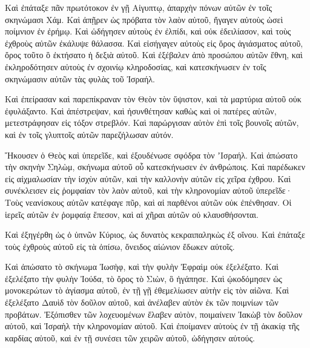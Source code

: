 {Καὶ ἐπάταξε πᾶν πρωτότοκον ἐν γῇ Αἰγυπτῳ, ἀπαρχὴν πόνων αὐτῶν ἐν τοῖς σκηνώμασι Χάμ.
Καὶ ἀπῇρεν ὡς πρόβατα τὸν λαὸν αὐτοῦ, ἤγαγεν αὐτοὺς ὡσεὶ ποίμνιον ἐν ἐρήμῳ.
Καὶ ὡδήγησεν αὐτοὺς ἐν ἐλπίδι, καὶ οὐκ ἐδειλίασον, καὶ τοὺς ἐχθροὺς αὐτῶν ἐκάλυψε θάλασσα.
Καὶ εἰσήγαγεν αὐτοὺς εἰς ὄρος ἁγιάσματος αὐτοῦ, ὄρος τοῦτο ὃ ἐκτήσατο ἡ δεξιὰ αὐτοῦ.
Καὶ ἐξέβαλεν ἀπὸ προσώπου αὐτῶν ἔθνη, καὶ ἐκληροδότησεν αὐτοὺς ἐν σχοινίῳ κληροδοσίας, καὶ κατεσκήνωσεν ἐν τοῖς σκηνώμασιν αὐτῶν τὰς φυλὰς τοῦ Ἰσραήλ.
\par }{\PP {}Καὶ ἐπείρασαν καὶ παρεπίκραναν τὸν Θεὸν τὸν ὕψιστον, καὶ τὰ μαρτύρια αὐτοῦ οὐκ ἐφυλάξαντο.
Καὶ ἀπέστρεψαν, καὶ ἠσυνθέτησαν καθὼς καὶ οἱ πατέρες αὐτῶν, μετεστράφησαν εἰς τόξον στρεβλόν.
Καὶ παρώργισαν αὐτὸν ἐπὶ τοῖς βουνοῖς αὐτῶν, καὶ ἐν τοῖς γλυπτοῖς αὐτῶν παρεζήλωσαν αὐτόν.
\par }{\PP {}Ἤκουσεν ὁ Θεὸς καὶ ὑπερεῖδε, καὶ ἐξουδένωσε σφόδρα τὸν ʼΙσραήλ.
Καὶ ἀπώσατο τὴν σκηνὴν Σηλὼμ, σκήνωμα αὐτοῦ οὗ κατεσκήνωσεν ἐν ἀνθρώποις.
Καὶ παρέδωκεν εἰς αἰχμαλωσίαν τὴν ἰσχὺν αὐτῶν, καὶ τὴν καλλονὴν αὐτῶν εἰς χεῖρα ἐχθρου.
Καὶ συνέκλεισεν εἰς ῥομφαίαν τὸν λαὸν αὐτοῦ, καὶ τὴν κληρονομίαν αὐτοῦ ὑπερεῖδε·
Τοὺς νεανίσκους αὐτῶν κατέφαγε πῦρ, καὶ αἱ παρθένοι αὐτῶν οὐκ ἐπένθησαν.
Οἱ ἱερεῖς αὐτῶν ἐν ῥομφαίᾳ ἔπεσον, καὶ αἱ χῆραι αὐτῶν οὐ κλαυσθήσονται.
\par }{\PP {}Καὶ ἐξηγέρθη ὡς ὁ ὑπνῶν Κύριος, ὡς δυνατὸς κεκραιπαληκὼς ἐξ οἴνου.
Καὶ ἐπάταξε τοὺς ἐχθροὺς αὐτοῦ εἰς τὰ ὀπίσω, ὄνειδος αἰώνιον ἔδωκεν αὐτοῖς.
\par }{\PP {}Καὶ ἀπώσατο τὸ σκήνωμα Ἰωσὴφ, καὶ τὴν φυλὴν Ἐφραὶμ οὐκ ἐξελέξατο.
Καὶ ἐξελέξατο τὴν φυλὴν Ἰούδα, τὸ ὄρος τὸ Σιὼν, ὃ ἠγάπησε.
Καὶ ᾠκοδόμησεν ὡς μονοκερώτων τὸ ἁγίασμα αὐτοῦ, ἐν τῇ γῇ ἐθεμελίωσεν αὐτὴν εἰς τὸν αἰῶνα.
Καὶ ἐξελέξατο Δαυὶδ τὸν δοῦλον αὐτοῦ, καὶ ἀνέλαβεν αὐτὸν ἐκ τῶν ποιμνίων τῶν προβάτων.
Ἐξόπισθεν τῶν λοχευομένων ἔλαβεν αὐτὸν, ποιμαίνειν Ἰακὼβ τὸν δοῦλον αὐτοῦ, καὶ Ἰσραὴλ τὴν κληρονομίαν αὐτοῦ.
Καὶ ἐποίμανεν αὐτοὺς ἐν τῇ ἀκακίᾳ τῆς καρδίας αὐτοῦ, καὶ ἐν τῇ συνέσει τῶν χειρῶν αὐτοῦ, ὡδήγησεν αὐτούς.

}
